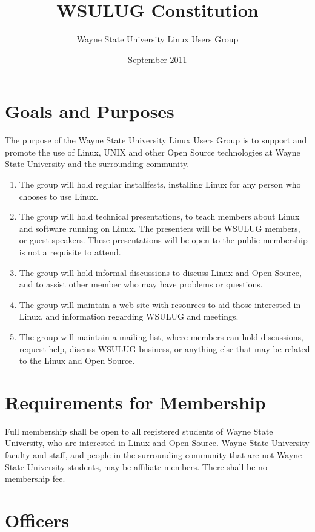 \documentclass{article}
\begin{document}
\title{WSULUG Constitution}
\author{Wayne State University Linux Users Group}
\date{September 2011}
\maketitle

\section{Goals and Purposes}
The purpose of the Wayne State University Linux Users Group is to support and promote the use of Linux, UNIX and other Open Source technologies at Wayne State University and the surrounding community.

\begin{enumerate}
\item The group will hold regular installfests, installing Linux for any person who chooses to use Linux.
\item The group will hold technical presentations, to teach members about Linux and software running on Linux.  The presenters will be WSULUG members, or guest speakers.  These presentations will be open to the public membership is not a requisite to attend.
\item The group will hold informal discussions to discuss Linux and Open Source, and to assist other member who may have problems or questions.
\item The group will maintain a web site with resources to aid those interested in Linux, and information regarding WSULUG and meetings.
\item The group will maintain a mailing list, where members can hold discussions, request help, discuss WSULUG business, or anything else that may be related to the Linux and Open Source.
\end{enumerate}

\section{Requirements for Membership}
Full membership shall be open to all registered students of Wayne State University, who are interested in Linux and Open Source.  Wayne State University faculty and staff, and people in the surrounding community that are not Wayne State University students, may be affiliate members. There shall be no membership fee.

\section{Officers}
\end{document}
